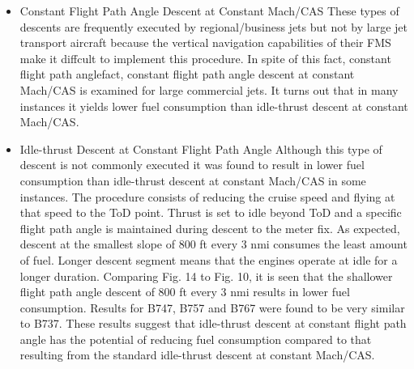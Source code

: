 \documentclass{aer1315-pretty}
\begin{document}
\begin{itemize}
\begin{itemize}
\item Constant Flight Path Angle Descent at Constant Mach/CAS
These types of descents are frequently executed by regional/business jets but not by large jet transport aircraft because the vertical navigation capabilities of their FMS make it diffcult to implement this procedure. In spite of this fact, constant flight path anglefact, constant flight path angle descent at constant Mach/CAS is examined for large commercial jets. It turns out that in many instances it yields lower fuel consumption than idle-thrust descent at constant Mach/CAS.

\item Idle-thrust Descent at Constant Flight Path Angle
Although this type of descent is not commonly executed it was found to result in lower fuel consumption than idle-thrust descent at constant Mach/CAS in some instances. The procedure consists of reducing the cruise speed and flying at that speed to the ToD point. Thrust is set to idle beyond ToD and a specific flight path angle is
maintained during descent to the meter fix.  As expected, descent at the smallest slope of 800 ft every 3 nmi consumes the least amount of fuel. Longer descent segment means that the engines operate at idle for a longer duration. Comparing Fig. 14 to Fig. 10, it is seen that the shallower flight path angle descent of 800 ft every 3 nmi results in lower fuel consumption. Results for B747, B757 and B767 were found to be very similar to B737. These results suggest that idle-thrust descent at constant flight path angle has the potential of reducing fuel consumption compared to that resulting from the standard idle-thrust descent at constant Mach/CAS.
\end{itemize}


\end{itemize}
\end{document}
